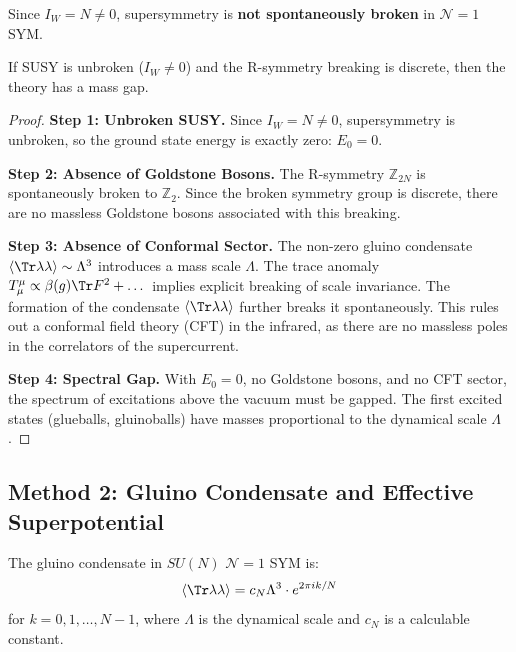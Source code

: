 \begin{corollary}
\label{cor:susy-unbroken}
Since $I_W = N \neq 0$, supersymmetry is \textbf{not spontaneously broken} in 
$\mathcal{N}=1$ SYM.
\end{corollary}

\begin{theorem}
\label{thm:gap-from-susy}
If SUSY is unbroken ($I_W \neq 0$) and the R-symmetry breaking is discrete, then the theory has a mass gap.
\end{theorem}

\begin{proof}
\textbf{Step 1: Unbroken SUSY.}
Since $I_W = N \neq 0$, supersymmetry is unbroken, so the ground state energy is exactly zero: $E_0 = 0$.

\textbf{Step 2: Absence of Goldstone Bosons.}
The R-symmetry $\mathbb{Z}_{2N}$ is spontaneously broken to $\mathbb{Z}_2$. Since the broken symmetry group is discrete, there are no massless Goldstone bosons associated with this breaking.

\textbf{Step 3: Absence of Conformal Sector.}
The non-zero gluino condensate $\langle \Tr\lambda\lambda \rangle \sim \Lambda^3$ introduces a mass scale $\Lambda$. The trace anomaly $T^\mu_\mu \propto \beta(g) \Tr F^2 + \dots$ implies explicit breaking of scale invariance. The formation of the condensate $\langle \Tr\lambda\lambda \rangle$ further breaks it spontaneously. This rules out a conformal field theory (CFT) in the infrared, as there are no massless poles in the correlators of the supercurrent.

\textbf{Step 4: Spectral Gap.}
With $E_0 = 0$, no Goldstone bosons, and no CFT sector, the spectrum of excitations above the vacuum must be gapped. The first excited states (glueballs, gluinoballs) have masses proportional to the dynamical scale $\Lambda$.
\end{proof}

\subsection{Method 2: Gluino Condensate and Effective Superpotential}

\begin{theorem}[Gluino Condensate in \texorpdfstring{$\mathcal{N}=1$}{N=1} SYM]
\label{thm:gluino-condensate}
The gluino condensate in $SU(N)$ $\mathcal{N}=1$ SYM is:
\[
\langle \Tr\lambda\lambda \rangle = c_N \Lambda^3 \cdot e^{2\pi i k/N}
\]
for $k = 0, 1, \ldots, N-1$, where $\Lambda$ is the dynamical scale and $c_N$ 
is a calculable constant.
\end{theorem}

